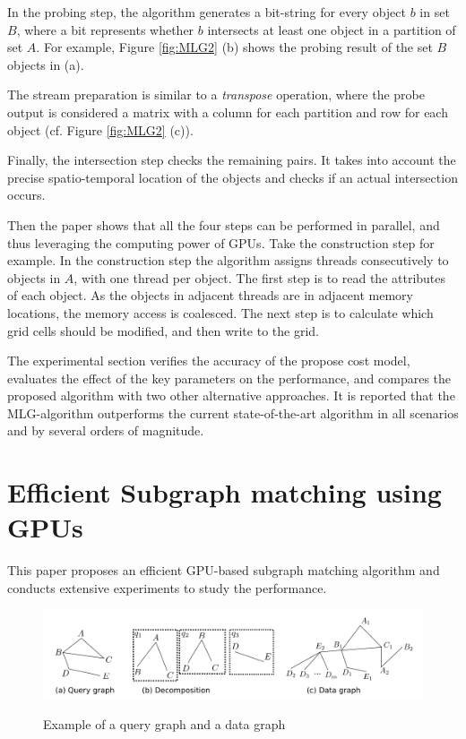 \documentclass[paper=a4, fontsize=18pt]{article} %
\numberwithin{equation}{section} %
\numberwithin{figure}{section} %
\numberwithin{table}{section} %
\begin{document}
In the probing step, the algorithm generates a bit-string for every object $b$ in set $B$, where a bit represents whether $b$ intersects at least one object in a partition of set $A$. For example, Figure \ref{fig:MLG2} (b) shows the probing result of the set $B$ objects in (a).

The stream preparation is similar to a \emph{transpose} operation, where the probe output is considered a matrix with a column for each partition and row for each object (cf. Figure \ref{fig:MLG2} (c)).

Finally, the intersection step checks the remaining pairs. It takes into account the precise spatio-temporal location of the objects and checks if an actual intersection occurs.

Then the paper shows that all the four steps can be performed in parallel, and thus leveraging the computing power of GPUs. Take the construction step for example. In the construction step the algorithm assigns threads consecutively to objects in $A$, with one thread per object. The first step is to read the attributes of each object. As the objects in adjacent threads are in adjacent memory locations, the memory access is coalesced. The next step is to calculate which grid cells should be modified, and then write to the grid.%

The experimental section verifies the accuracy of the propose cost model, evaluates the effect of the key parameters on the performance, and compares the proposed algorithm with two other alternative approaches. It is reported that the MLG-algorithm outperforms the current state-of-the-art algorithm in all scenarios and by several orders of magnitude.

\section{Efficient Subgraph matching using GPUs \cite{LZWWQ14}}

This paper proposes an efficient GPU-based subgraph matching algorithm and conducts extensive experiments to study the performance.

\begin{figure}[h]
  \centering
  \includegraphics[width=.9\linewidth]{8_1_gpu1.png}\\
  \caption{Example of a query graph and a data graph}\label{fig:gpu1}
\end{figure}
\end{document}
